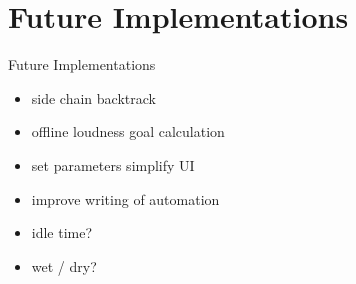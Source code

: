 \section{Future Implementations}


\begin{frame}[c]{Future Implementations}{}
    \begin{itemize}
    	\item side chain backtrack
    	\item offline loudness goal calculation
    	\item set parameters \filledrightarrow[uhhblue] simplify UI
    	\item improve writing of automation
    	\item idle time?
    	\item wet / dry?
    \end{itemize}
\end{frame}
